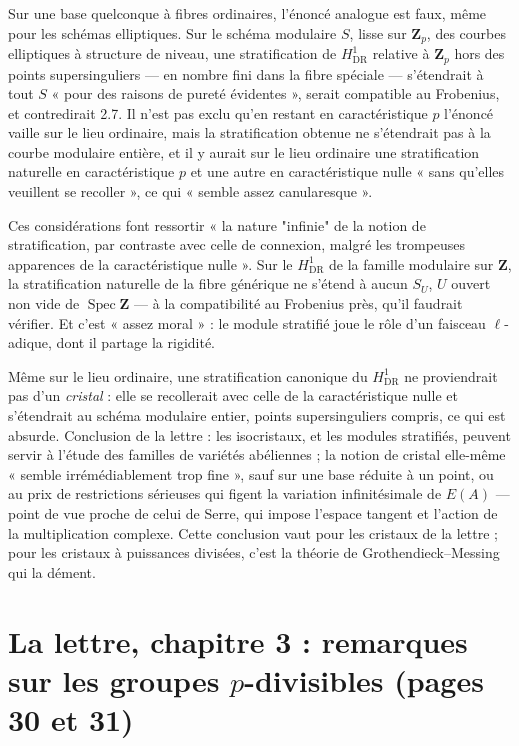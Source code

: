 \documentclass[11pt,a4paper]{article}
\begin{document}
Sur une base quelconque à fibres ordinaires, l'énoncé analogue est faux, même
pour les schémas elliptiques. Sur le schéma modulaire $S$, lisse sur
$\mathbf{Z}_p$, des courbes elliptiques à structure de niveau, une
stratification de $H^1_{\mathrm{DR}}$ relative à $\mathbf{Z}_p$ hors des
points supersinguliers — en nombre fini dans la fibre spéciale — s'étendrait à
tout $S$ « pour des raisons de pureté évidentes », serait compatible au
Frobenius, et contredirait 2.7. Il n'est pas exclu qu'en restant en
caractéristique $p$ l'énoncé vaille sur le lieu ordinaire, mais la
stratification obtenue ne s'étendrait pas à la courbe modulaire entière, et
il y aurait sur le lieu ordinaire une stratification naturelle en
caractéristique $p$ et une autre en caractéristique nulle « sans qu'elles
veuillent se recoller », ce qui « semble assez canularesque ».

Ces considérations font ressortir « la nature "infinie" de la notion de
stratification, par contraste avec celle de connexion, malgré les trompeuses
apparences de la caractéristique nulle ». Sur le $H^1_{\mathrm{DR}}$ de la
famille modulaire sur $\mathbf{Z}$, la stratification naturelle de la fibre
générique ne s'étend à aucun $S_U$, $U$ ouvert non vide de
$\operatorname{Spec}\mathbf{Z}$ — à la compatibilité au Frobenius près, qu'il
faudrait vérifier. Et c'est « assez moral » : le module stratifié joue le rôle
d'un faisceau $\ell$-adique, dont il partage la rigidité.

Même sur le lieu ordinaire, une stratification canonique du $H^1_{\mathrm{DR}}$
ne proviendrait pas d'un \emph{cristal} : elle se recollerait avec celle de la
caractéristique nulle et s'étendrait au schéma modulaire entier, points
supersinguliers compris, ce qui est absurde. Conclusion de la lettre : les
isocristaux, et les modules stratifiés, peuvent servir à l'étude des familles
de variétés abéliennes ; la notion de cristal elle-même « semble
irrémédiablement trop fine », sauf sur une base réduite à un point, ou au prix
de restrictions sérieuses qui figent la variation infinitésimale de $E(A)$ —
point de vue proche de celui de Serre, qui impose l'espace tangent et l'action
de la multiplication complexe. Cette conclusion vaut pour les cristaux de la
lettre ; pour les cristaux à puissances divisées, c'est la théorie de
Grothendieck--Messing qui la dément.

\section*{La lettre, chapitre 3 : remarques sur les groupes $p$-divisibles (pages 30 et 31)}
\end{document}
